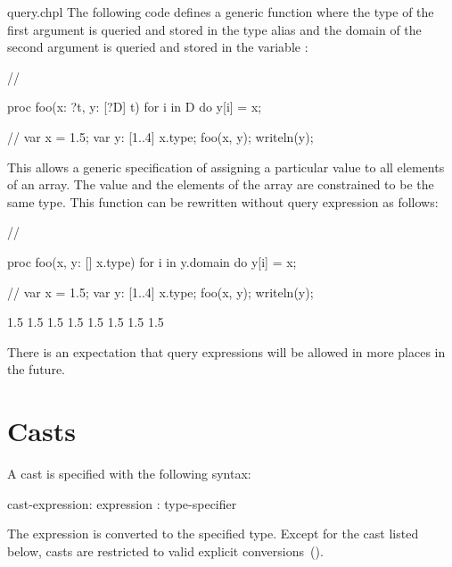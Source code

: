\begin{chapelexample}{query.chpl}
The following code defines a generic function where the type of the
first argument is queried and stored in the type alias  and
the domain of the second argument is queried and stored in the
variable :
\begin{chapelnoprint}
{ // }
\end{chapelnoprint}
\begin{chapel}
proc foo(x: ?t, y: [?D] t) {
  for i in D do
    y[i] = x;
}
\end{chapel}
\begin{chapelnoprint}
// {
var x = 1.5;
var y: [1..4] x.type;
foo(x, y);
writeln(y);
}
\end{chapelnoprint}
This allows a generic specification of assigning a
particular value to all elements of an array.  The value and the
elements of the array are constrained to be the same type.  This
function can be rewritten without query expression as follows:
\begin{chapelnoprint}
{ // }
\end{chapelnoprint}
\begin{chapel}
proc foo(x, y: [] x.type) {
  for i in y.domain do
    y[i] = x;
}
\end{chapel}
\begin{chapelnoprint}
// {
var x = 1.5;
var y: [1..4] x.type;
foo(x, y);
writeln(y);
}
\end{chapelnoprint}
\begin{chapeloutput}
1.5 1.5 1.5 1.5
1.5 1.5 1.5 1.5
\end{chapeloutput}
\end{chapelexample}

There is an expectation that query expressions will be allowed in more
places in the future.

\section{Casts}
\label{Casts}

A cast is specified with the following syntax:
\begin{syntax}
cast-expression:
  expression : type-specifier
\end{syntax}
The expression is converted to the specified type.  Except for the
cast listed below, casts are restricted to valid explicit
conversions~().

